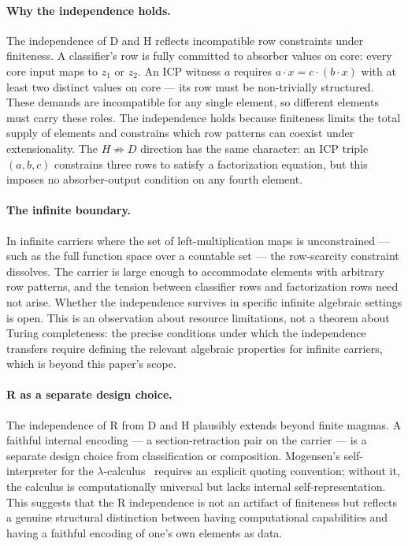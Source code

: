 \documentclass[sigconf,screen,review,anonymous]{acmart}
\newcommand{\dotop}{\cdot}
\theoremstyle{remark}
\begin{document}
\paragraph{Why the independence holds.}
The independence of D and H reflects incompatible row constraints under finiteness. A classifier's row is fully committed to absorber values on core: every core input maps to $z_1$ or $z_2$. An ICP witness $a$ requires $a \dotop x = c \dotop (b \dotop x)$ with at least two distinct values on core --- its row must be non-trivially structured. These demands are incompatible for any single element, so different elements must carry these roles. The independence holds because finiteness limits the total supply of elements and constrains which row patterns can coexist under extensionality. The $H \not\Rightarrow D$ direction has the same character: an ICP triple $(a, b, c)$ constrains three rows to satisfy a factorization equation, but this imposes no absorber-output condition on any fourth element.

\paragraph{The infinite boundary.}
In infinite carriers where the set of left-multiplication maps is unconstrained --- such as the full function space over a countable set --- the row-scarcity constraint dissolves. The carrier is large enough to accommodate elements with arbitrary row patterns, and the tension between classifier rows and factorization rows need not arise. Whether the independence survives in specific infinite algebraic settings is open. This is an observation about resource limitations, not a theorem about Turing completeness: the precise conditions under which the independence transfers require defining the relevant algebraic properties for infinite carriers, which is beyond this paper's scope.

\paragraph{R as a separate design choice.}
The independence of R from D and H plausibly extends beyond finite magmas. A faithful internal encoding --- a section-retraction pair on the carrier --- is a separate design choice from classification or composition. Mogensen's self-interpreter for the $\lambda$-calculus~\cite{mogensen92} requires an explicit quoting convention; without it, the calculus is computationally universal but lacks internal self-representation. This suggests that the R independence is not an artifact of finiteness but reflects a genuine structural distinction between having computational capabilities and having a faithful encoding of one's own elements as data.
\end{document}
